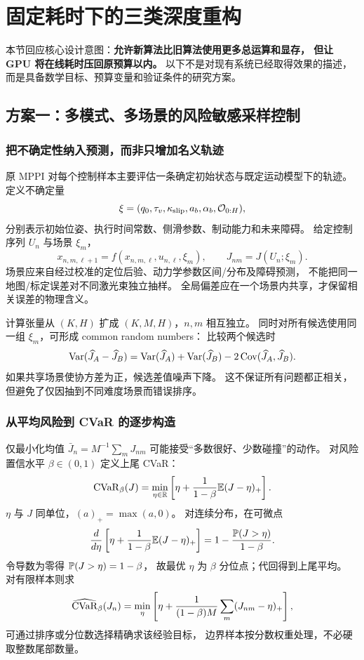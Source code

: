 \section{固定耗时下的三类深度重构}
\label{sec:deep}
本节回应核心设计意图：\textbf{允许新算法比旧算法使用更多总运算和显存，
但让 GPU 将在线耗时压回原预算以内。}
以下不是对现有系统已经取得效果的描述，而是具备数学目标、预算变量和验证条件的研究方案。

\subsection{方案一：多模式、多场景的风险敏感采样控制}
\subsubsection{把不确定性纳入预测，而非只增加名义轨迹}
原 MPPI 对每个控制样本主要评估一条确定初始状态与既定运动模型下的轨迹。
定义不确定量
\[
\xi=(q_0,\tau_v,\kappa_{\rm slip},a_b,\alpha_b,\mathcal O_{0:H}),
\]
分别表示初始位姿、执行时间常数、侧滑参数、制动能力和未来障碍。
给定控制序列 $U_n$ 与场景 $\xi_m$，
\[
x_{n,m,\ell+1}=f(x_{n,m,\ell},u_{n,\ell},\xi_m),\qquad
J_{nm}=J(U_n;\xi_m).
\]
场景应来自经过校准的定位后验、动力学参数区间/分布及障碍预测，
不能把同一地图/标定误差对不同激光束独立抽样。
全局偏差应在一个场景内共享，才保留相关误差的物理含义。

计算张量从 $(K,H)$ 扩成 $(K,M,H)$，$n,m$ 相互独立。
同时对所有候选使用同一组 $\xi_m$，可形成 common random numbers：
比较两个候选时
\[
\operatorname{Var}(\widehat J_A-\widehat J_B)
=\operatorname{Var}(\widehat J_A)+\operatorname{Var}(\widehat J_B)
-2\operatorname{Cov}(\widehat J_A,\widehat J_B).
\]
如果共享场景使协方差为正，候选差值噪声下降。
这不保证所有问题都正相关，但避免了仅因抽到不同难度场景而错误排序。

\subsubsection{从平均风险到 CVaR 的逐步构造}
仅最小化均值
$\bar J_n=M^{-1}\sum_mJ_{nm}$
可能接受“多数很好、少数碰撞”的动作。
对风险置信水平 $\beta\in(0,1)$ 定义上尾 CVaR：
\begin{equation}
\operatorname{CVaR}_\beta(J)
=\min_{\eta\in\mathbb R}
\left[\eta+\frac1{1-\beta}\mathbb E(J-\eta)_+\right].
\label{eq:cvar}
\end{equation}
$\eta$ 与 $J$ 同单位，$(a)_+=\max(a,0)$。
对连续分布，在可微点
\[
\frac{d}{d\eta}\left[\eta+\frac1{1-\beta}\mathbb E(J-\eta)_+\right]
=1-\frac{\mathbb P(J>\eta)}{1-\beta}.
\]
令导数为零得 $\mathbb P(J>\eta)=1-\beta$，
故最优 $\eta$ 为 $\beta$ 分位点；代回得到上尾平均。
对有限样本则求
\[
\widehat{\operatorname{CVaR}}_\beta(J_n)
=\min_\eta\left[\eta+\frac1{(1-\beta)M}\sum_m(J_{nm}-\eta)_+\right],
\]
可通过排序或分位数选择精确求该经验目标，
边界样本按分数权重处理，不必硬取整数尾部数量。


